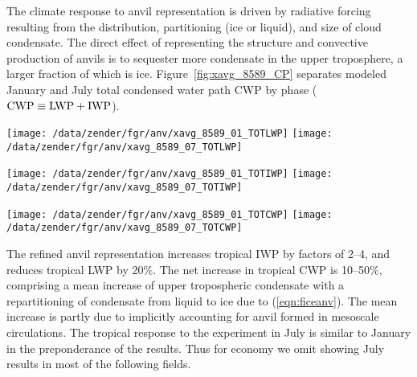 \documentclass[twoside,agupp]{aguplus}
\begin{document}
The climate response to anvil representation is driven by radiative
forcing resulting from the distribution, partitioning (ice or liquid),
and size of cloud condensate. 
The direct effect of representing the structure and convective
production of anvils is to sequester more condensate in the upper
troposphere, a larger fraction of which is ice. 
Figure~\ref{fig:xavg_8589_CP} separates modeled January and July 
total condensed water path CWP by phase ($\mbox{\textrm{CWP}} \equiv \mbox{\textrm{LWP}} + \mbox{\textrm{IWP}}$).
\begin{figure*}
\begin{center}
\texttt{[image: /data/zender/fgr/anv/xavg\_8589\_01\_TOTLWP]}%
\texttt{[image: /data/zender/fgr/anv/xavg\_8589\_07\_TOTLWP]}%

\texttt{[image: /data/zender/fgr/anv/xavg\_8589\_01\_TOTIWP]}%
\texttt{[image: /data/zender/fgr/anv/xavg\_8589\_07\_TOTIWP]}%

\texttt{[image: /data/zender/fgr/anv/xavg\_8589\_01\_TOTCWP]}%
\texttt{[image: /data/zender/fgr/anv/xavg\_8589\_07\_TOTCWP]}%
\end{center}
\caption[Zonal average column condensate burdens from
1985--1989 January and July simulations by CCM and ANV]{
Zonal average column condensate burdens (\gxmS) from
1985--1989 (left) January and (right) July simulations by (solid) CCM
and (dashed) ANV of (a,b) LWP, (c,d) IWP, and (e,f) CWP.   
\label{fig:xavg_8589_CP}}   
\end{figure*}
The refined anvil representation increases tropical IWP by factors
of 2--4, and reduces tropical LWP by 20\%.
The net increase in tropical CWP is 10--50\%, comprising a mean
increase of upper tropospheric condensate with a repartitioning of 
condensate from liquid to ice due to (\ref{eqn:ficeanv}).
The mean increase is partly due to implicitly accounting for anvil
formed in mesoscale circulations.
The tropical response to the experiment in July is similar to January
in the preponderance of the results.  
Thus for economy we omit showing July results in most of the following
fields. 
\end{document}
